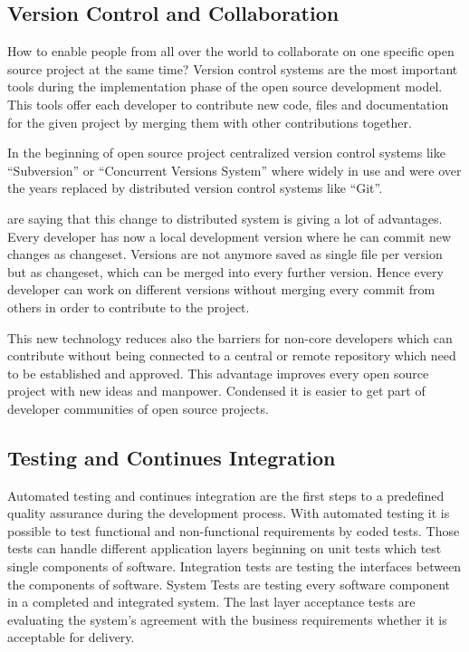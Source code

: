 \documentclass[DIV=calc,paper=a4,fontsize=9pt,twocolumn]{scrartcl}
\begin{document}
\subsection{Version Control and Collaboration}

How to enable people from all over the world to collaborate on one specific open source project at the same time? Version control systems are the most important tools during the implementation phase of the open source development model. This tools offer each developer to contribute new code, files and documentation for the given project by merging them with other contributions together. 

In the beginning of open source project centralized version control systems like \enquote{Subversion} or \enquote{Concurrent Versions System} where widely in use and were over the years replaced by distributed version control systems like \enquote{Git}. 

\citet{rodriguez2012distributed} are saying that this change to distributed system is giving a lot of advantages. Every developer has now a local development version where he can commit new changes as changeset. Versions are not anymore saved as single file per version but as changeset, which can be merged into every further version. Hence every developer can work on different versions without merging every commit from others in order to contribute to the project.

This new technology reduces also the barriers for non-core developers which can contribute without being connected to a central or remote repository which need to be established and approved. This advantage improves every open source project with new ideas and manpower. Condensed it is easier to get part of developer communities of open source projects. \citep{rodriguez2012distributed}

\subsection{Testing and Continues Integration}

Automated testing and continues integration are the first steps to a predefined quality assurance during the development process. With automated testing it is possible to test functional and non-functional requirements by coded tests. Those tests can handle different application layers beginning on unit tests which test single components of software. Integration tests are testing the interfaces between the components of software. System Tests are testing every software component in a completed and integrated system. The last layer acceptance tests are evaluating the system's agreement with the business requirements whether it is acceptable for delivery. \citep{abran2001guide}
\end{document}

